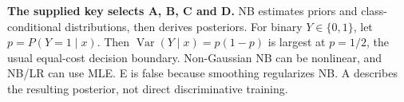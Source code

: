 \textbf{The supplied key selects A, B, C and D.} NB estimates priors and class-conditional distributions, then derives posteriors. For binary \(Y\in\{0,1\}\), let \(p=P(Y=1\mid x)\). Then \(\operatorname{Var}(Y\mid x)=p(1-p)\) is largest at \(p=1/2\), the usual equal-cost decision boundary. Non-Gaussian NB can be nonlinear, and NB/LR can use MLE. E is false because smoothing regularizes NB. A describes the resulting posterior, not direct discriminative training.
